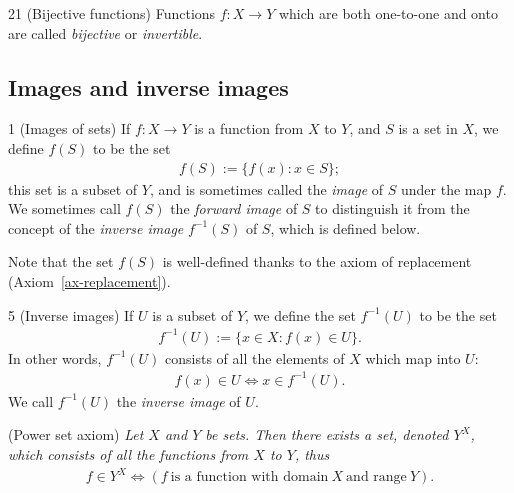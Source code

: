 \begin{definition}{21}
    \label{bijective}
    (Bijective functions) Functions $f: X\rightarrow Y$ which are both one-to-one and onto are called \emph{bijective}
    or \emph{invertible}.
\end{definition}

\subsection{Images and inverse images}
\begin{definition}{1}
    \label{image}
    (Images of sets) If $f: X\rightarrow Y$ is a function from $X$ to $Y$, and $S$ is a set in $X$, we define $f(S)$ to be
    the set
    \begin{align*}
        f(S) := \{f(x):x\in S\};
    \end{align*}
    this set is a subset of $Y$, and is sometimes called the \emph{image} of $S$ under the map $f$. We sometimes call
    $f(S)$ the \emph{forward image} of $S$ to distinguish it from the concept of the \emph{inverse image} $f^{-1}(S)$
    of $S$, which is defined below.

    Note that the set $f(S)$ is well-defined thanks to the axiom of replacement (Axiom~\ref{ax-replacement}).
\end{definition}

\begin{definition}{5}
    \label{inverse-image}
    (Inverse images) If $U$ is a subset of $Y$, we define the set $f^{-1}(U)$ to be the set
    \begin{align*}
        f^{-1}(U) := \{x\in X:f(x)\in U\}.
    \end{align*}
    In other words, $f^{-1}(U)$ consists of all the elements of $X$ which map into $U$:
    \begin{align*}
        f(x)\in U \iff x\in f^{-1}(U).
    \end{align*}
    We call $f^{-1}(U)$ the \emph{inverse image} of $U$.
\end{definition}

\begin{axiom}
    \label{ax-power-set}
    (Power set axiom) \emph{Let $X$ and $Y$ be sets. Then there exists a set, denoted $Y^X$, which consists of all the
    functions from $X$ to $Y$, thus
    \begin{align*}
        f\in Y^X \iff (f~\text{is a function with domain}~X~\text{and range}~Y).
    \end{align*}}
\end{axiom}

